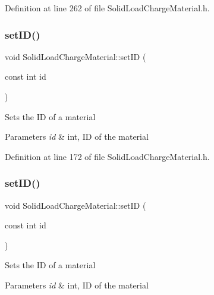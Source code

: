 Definition at line 262 of file Solid\+Load\+Charge\+Material.\+h.

\mbox{\label{class_solid_load_charge_material_a4cc8e12ffb340c94106cecf576a85ae5}} 
\subsubsection{\texorpdfstring{set\+I\+D()}{setID()}\hspace{0.1cm}{\footnotesize\ttfamily [1/3]}}
{\footnotesize\ttfamily void Solid\+Load\+Charge\+Material\+::set\+ID (\begin{DoxyParamCaption}\item[{const int}]{id }\end{DoxyParamCaption})\hspace{0.3cm}{\ttfamily [inline]}}

Sets the ID of a material 
\begin{DoxyParams}{Parameters}
{\em id} & int, ID of the material \\
\hline
\end{DoxyParams}


Definition at line 172 of file Solid\+Load\+Charge\+Material.\+h.

\mbox{\label{class_solid_load_charge_material_a4cc8e12ffb340c94106cecf576a85ae5}} 
\subsubsection{\texorpdfstring{set\+I\+D()}{setID()}\hspace{0.1cm}{\footnotesize\ttfamily [2/3]}}
{\footnotesize\ttfamily void Solid\+Load\+Charge\+Material\+::set\+ID (\begin{DoxyParamCaption}\item[{const int}]{id }\end{DoxyParamCaption})\hspace{0.3cm}{\ttfamily [inline]}}

Sets the ID of a material 
\begin{DoxyParams}{Parameters}
{\em id} & int, ID of the material \\
\hline
\end{DoxyParams}


